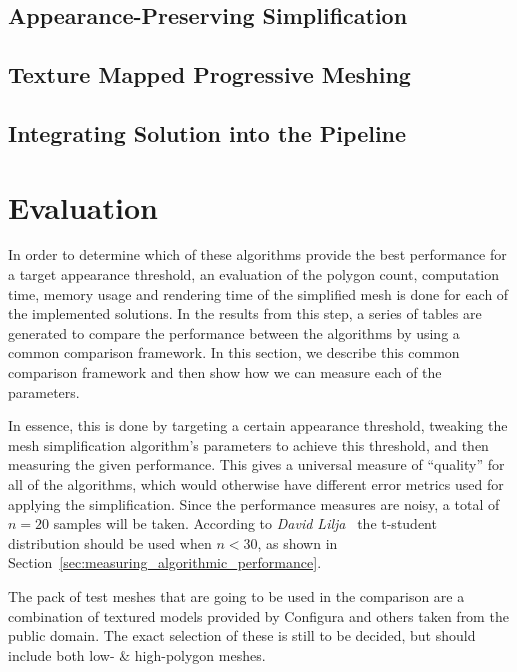        \subsection{Appearance-Preserving Simplification} \label{sec:appearance-preserving_simplification2}

        \subsection{Texture Mapped Progressive Meshing} \label{sec:texture_mapped_progressive_meshing2}

        \subsection{Integrating Solution into the Pipeline} \label{sec:integrating_solution_into_the_pipeline}

    \newpage

    \section{Evaluation} \label{sec:evaluation}

        In order to determine which of these algorithms provide the best performance for a target appearance threshold, an evaluation of the polygon count, computation time, memory usage and rendering time of the simplified mesh is done for each of the implemented solutions. In the results from this step, a series of tables are generated to compare the performance between the algorithms by using a common comparison framework. In this section, we describe this common comparison framework and then show how we can measure each of the parameters.

        In essence, this is done by targeting a certain appearance threshold, tweaking the mesh simplification algorithm's parameters to achieve this threshold, and then measuring the given performance. This gives a universal measure of ``quality'' for all of the algorithms, which would otherwise have different error metrics used for applying the simplification. Since the performance measures are noisy, a total of \(n=20\) samples will be taken. According to \emph{David Lilja}~\cite[p.~50]{lilja2005measuring} the t-student distribution should be used when \(n < 30\), as shown in Section~\ref{sec:measuring_algorithmic_performance}.

        The pack of test meshes that are going to be used in the comparison are a combination of textured models provided by Configura and others taken from the public domain. The exact selection of these is still to be decided, but should include both low- \& high-polygon meshes.

